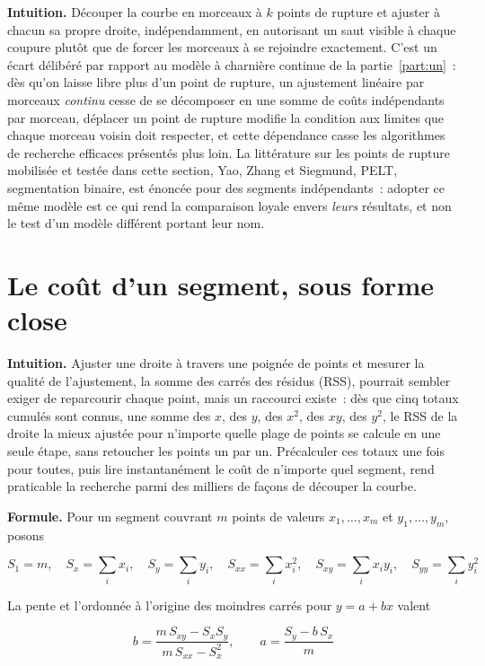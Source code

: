 \documentclass[11pt]{article}
\begin{document}
\textbf{Intuition.} Découper la courbe en morceaux à $k$ points de rupture
et ajuster à chacun sa propre droite, indépendamment, en autorisant un saut
visible à chaque coupure plutôt que de forcer les morceaux à se rejoindre
exactement. C'est un écart délibéré par rapport au modèle à charnière
continue de la partie~\ref{part:un}~: dès qu'on laisse libre plus d'un
point de rupture, un ajustement linéaire par morceaux \emph{continu} cesse
de se décomposer en une somme de coûts indépendants par morceau, déplacer
un point de rupture modifie la condition aux limites que chaque morceau
voisin doit respecter, et cette dépendance casse les algorithmes de
recherche efficaces présentés plus loin. La littérature sur les points de
rupture mobilisée et testée dans cette section, Yao, Zhang et Siegmund,
PELT, segmentation binaire, est énoncée pour des segments indépendants~:
adopter ce même modèle est ce qui rend la comparaison loyale envers
\emph{leurs} résultats, et non le test d'un modèle différent portant leur
nom.

\section{Le coût d'un segment, sous forme close}

\textbf{Intuition.} Ajuster une droite à travers une poignée de points et
mesurer la qualité de l'ajustement, la somme des carrés des résidus (RSS),
pourrait sembler exiger de reparcourir chaque point, mais un raccourci
existe~: dès que cinq totaux cumulés sont connus, une somme des $x$, des
$y$, des $x^2$, des $xy$, des $y^2$, le RSS de la droite la mieux ajustée
pour n'importe quelle plage de points se calcule en une seule étape, sans
retoucher les points un par un. Précalculer ces totaux une fois pour
toutes, puis lire instantanément le coût de n'importe quel segment, rend
praticable la recherche parmi des milliers de façons de découper la courbe.

\textbf{Formule.} Pour un segment couvrant $m$ points de valeurs $x_1,
\dots, x_m$ et $y_1, \dots, y_m$, posons

\begin{equation}
S_1 = m,\quad S_x = \sum_i x_i,\quad S_y = \sum_i y_i,\quad S_{xx} = \sum_i x_i^2,\quad S_{xy} = \sum_i x_i y_i,\quad S_{yy} = \sum_i y_i^2
\end{equation}

La pente et l'ordonnée à l'origine des moindres carrés pour $y = a + bx$
valent

\begin{equation}
b = \frac{m\,S_{xy} - S_x S_y}{m\,S_{xx} - S_x^2}, \qquad a = \frac{S_y - b\,S_x}{m}
\end{equation}
\end{document}
